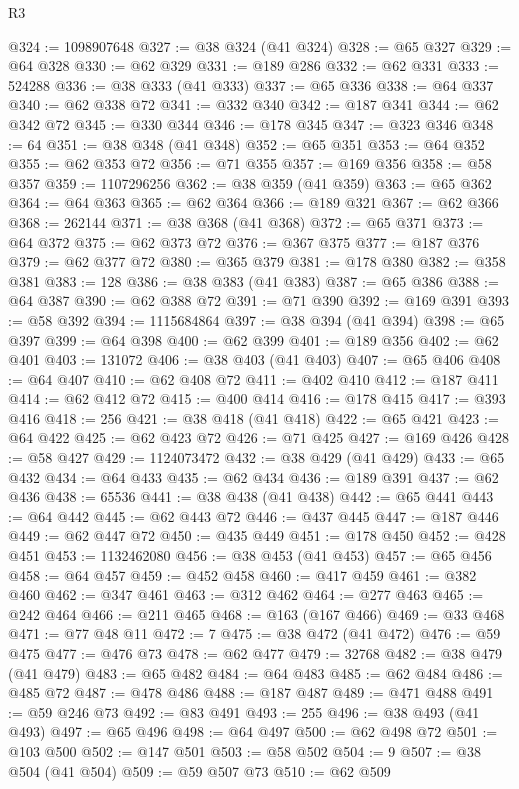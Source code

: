 \begin{lexlean}{R3}
\begin{coremodule}
@324 := 1098907648
@327 := @38 @324 (@41 @324)
@328 := @65 @327
@329 := @64 @328
@330 := @62 @329
@331 := @189 @286
@332 := @62 @331
@333 := 524288
@336 := @38 @333 (@41 @333)
@337 := @65 @336
@338 := @64 @337
@340 := @62 @338 @72
@341 := @332 @340
@342 := @187 @341
@344 := @62 @342 @72
@345 := @330 @344
@346 := @178 @345
@347 := @323 @346
@348 := 64
@351 := @38 @348 (@41 @348)
@352 := @65 @351
@353 := @64 @352
@355 := @62 @353 @72
@356 := @71 @355
@357 := @169 @356
@358 := @58 @357
@359 := 1107296256
@362 := @38 @359 (@41 @359)
@363 := @65 @362
@364 := @64 @363
@365 := @62 @364
@366 := @189 @321
@367 := @62 @366
@368 := 262144
@371 := @38 @368 (@41 @368)
@372 := @65 @371
@373 := @64 @372
@375 := @62 @373 @72
@376 := @367 @375
@377 := @187 @376
@379 := @62 @377 @72
@380 := @365 @379
@381 := @178 @380
@382 := @358 @381
@383 := 128
@386 := @38 @383 (@41 @383)
@387 := @65 @386
@388 := @64 @387
@390 := @62 @388 @72
@391 := @71 @390
@392 := @169 @391
@393 := @58 @392
@394 := 1115684864
@397 := @38 @394 (@41 @394)
@398 := @65 @397
@399 := @64 @398
@400 := @62 @399
@401 := @189 @356
@402 := @62 @401
@403 := 131072
@406 := @38 @403 (@41 @403)
@407 := @65 @406
@408 := @64 @407
@410 := @62 @408 @72
@411 := @402 @410
@412 := @187 @411
@414 := @62 @412 @72
@415 := @400 @414
@416 := @178 @415
@417 := @393 @416
@418 := 256
@421 := @38 @418 (@41 @418)
@422 := @65 @421
@423 := @64 @422
@425 := @62 @423 @72
@426 := @71 @425
@427 := @169 @426
@428 := @58 @427
@429 := 1124073472
@432 := @38 @429 (@41 @429)
@433 := @65 @432
@434 := @64 @433
@435 := @62 @434
@436 := @189 @391
@437 := @62 @436
@438 := 65536
@441 := @38 @438 (@41 @438)
@442 := @65 @441
@443 := @64 @442
@445 := @62 @443 @72
@446 := @437 @445
@447 := @187 @446
@449 := @62 @447 @72
@450 := @435 @449
@451 := @178 @450
@452 := @428 @451
@453 := 1132462080
@456 := @38 @453 (@41 @453)
@457 := @65 @456
@458 := @64 @457
@459 := @452 @458
@460 := @417 @459
@461 := @382 @460
@462 := @347 @461
@463 := @312 @462
@464 := @277 @463
@465 := @242 @464
@466 := @211 @465
@468 := @163 (@167 @466)
@469 := @33 @468
@471 := @77 @48 @11
@472 := 7
@475 := @38 @472 (@41 @472)
@476 := @59 @475
@477 := @476 @73
@478 := @62 @477
@479 := 32768
@482 := @38 @479 (@41 @479)
@483 := @65 @482
@484 := @64 @483
@485 := @62 @484
@486 := @485 @72
@487 := @478 @486
@488 := @187 @487
@489 := @471 @488
@491 := @59 @246 @73
@492 := @83 @491
@493 := 255
@496 := @38 @493 (@41 @493)
@497 := @65 @496
@498 := @64 @497
@500 := @62 @498 @72
@501 := @103 @500
@502 := @147 @501
@503 := @58 @502
@504 := 9
@507 := @38 @504 (@41 @504)
@509 := @59 @507 @73
@510 := @62 @509

\end{coremodule}
\end{lexlean}
